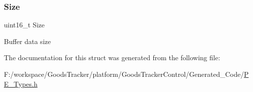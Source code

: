\subsubsection{\texorpdfstring{Size}{Size}}
{\footnotesize\ttfamily uint16\+\_\+t Size}

Buffer data size 

The documentation for this struct was generated from the following file\+:\begin{DoxyCompactItemize}
\item 
F\+:/workspace/\+Goods\+Tracker/platform/\+Goods\+Tracker\+Control/\+Generated\+\_\+\+Code/\hyperlink{_p_e___types_8h}{P\+E\+\_\+\+Types.\+h}\end{DoxyCompactItemize}
